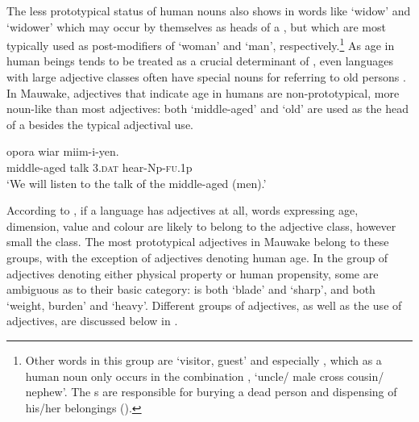 \largerpage[2]
The less prototypical status of human nouns also shows in words like  `widow' and  `widower' which may occur by themselves as heads of a , but which are most typically used as post-modifiers of  `woman' and  `man', respectively.\footnote{Other words in this group are \textbf{\textit{} }`visitor, guest' and especially , which as a human noun only occurs in the combination , `uncle/ male cross cousin/ nephew'. The s are responsible for burying a dead person and dispensing of his/her belongings ().} As age in human beings tends to be treated as a crucial determinant of , even languages with large adjective classes often have special nouns for referring to old persons \citep[368]{Wierzbicka1986}. In Mauwake, adjectives that indicate age in humans are non-prototypical, more noun-like than most adjectives: both  `middle-aged'  and  `old' are used as the head of a  besides the typical adjectival use.

\ea%
\label{ex:3:x25}
\gll {} opora wiar miim-i-yen. \\
middle-aged talk 3.\textsc{dat} hear-Np-\textsc{fu}.1p\\
\glt`We will listen to the talk of the middle-aged (men).'
\z

According to \citet[56]{Dixon1977}, if a language has adjectives at all, words expressing age, dimension, value and colour are likely to belong to the adjective class, however small the class. The most prototypical adjectives in Mauwake belong to these groups, with the exception of adjectives denoting human age. In the group of adjectives denoting either physical property or human propensity, some are ambiguous as to their basic category:  is both `blade' and `sharp', and  both `weight, burden' and `heavy'. Different groups of adjectives, as well as the use of adjectives, are discussed below in .

